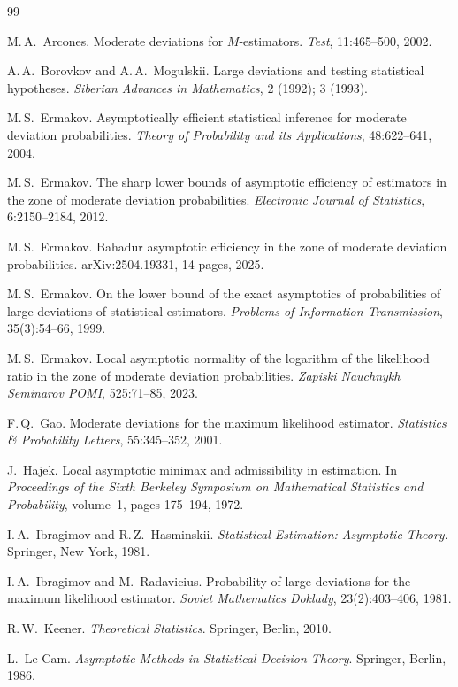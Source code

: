 \documentclass[11pt,a4paper]{article}
\begin{document}
\begin{thebibliography}{99}

M.\,A.~Arcones.
Moderate deviations for $M$-estimators.
\textit{Test}, 11:465--500, 2002.

A.\,A.~Borovkov and A.\,A.~Mogulskii.
Large deviations and testing statistical hypotheses.
\textit{Siberian Advances in Mathematics}, 2 (1992); 3 (1993).

M.\,S.~Ermakov.
Asymptotically efficient statistical inference for moderate deviation probabilities.
\textit{Theory of Probability and its Applications}, 48:622--641, 2004.

M.\,S.~Ermakov.
The sharp lower bounds of asymptotic efficiency of estimators in the zone of moderate deviation probabilities.
\textit{Electronic Journal of Statistics}, 6:2150--2184, 2012.

M.\,S.~Ermakov.
Bahadur asymptotic efficiency in the zone of moderate deviation probabilities.
arXiv:2504.19331, 14 pages, 2025.

M.\,S.~Ermakov.
On the lower bound of the exact asymptotics of probabilities of large deviations of statistical estimators.
\textit{Problems of Information Transmission}, 35(3):54--66, 1999.

M.\,S.~Ermakov.
Local asymptotic normality of the logarithm of the likelihood ratio in the zone of moderate deviation probabilities.
\textit{Zapiski Nauchnykh Seminarov POMI}, 525:71--85, 2023.

F.\,Q.~Gao.
Moderate deviations for the maximum likelihood estimator.
\textit{Statistics \& Probability Letters}, 55:345--352, 2001.

J.~Hajek.
Local asymptotic minimax and admissibility in estimation.
In \textit{Proceedings of the Sixth Berkeley Symposium on Mathematical Statistics and Probability}, volume~1, pages 175--194, 1972.

I.\,A.~Ibragimov and R.\,Z.~Hasminskii.
\textit{Statistical Estimation: Asymptotic Theory}.
Springer, New York, 1981.

I.\,A.~Ibragimov and M.~Radavicius.
Probability of large deviations for the maximum likelihood estimator.
\textit{Soviet Mathematics Doklady}, 23(2):403--406, 1981.

R.\,W.~Keener.
\textit{Theoretical Statistics}.
Springer, Berlin, 2010.

L.~Le Cam.
\textit{Asymptotic Methods in Statistical Decision Theory}.
Springer, Berlin, 1986.


\end{thebibliography}
\end{document}
